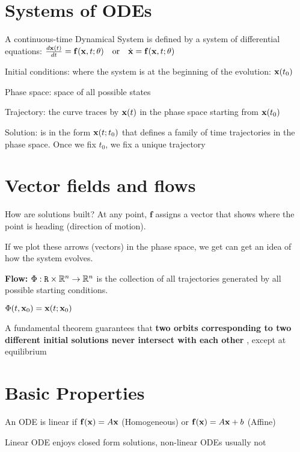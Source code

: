 \section*{Systems of ODEs}

A continuous-time Dynamical System is defined by a system of differential equations:
$
\frac{d\mathbf{x}(t)}{dt} = \mathbf{f}(\mathbf{x}, t; \theta) \quad \text{or} \quad \dot{\mathbf{x}} = \mathbf{f}(\mathbf{x}, t; \theta)
$

\begin{tightitemize}
    \item Initial conditions: where the system is at the beginning of the evolution:
    $\mathbf{x}(t_0)$
    \item Phase space: space of all possible states
    \item Trajectory: the curve traces by $\mathbf{x}(t)$ in the phase space starting from $\mathbf{x}(t_0)$
    \item Solution: is in the form $\mathbf{x}(t; t_0)$ that defines a family of time trajectories
    in the phase space. Once we fix $t_0$, we fix a unique trajectory
\end{tightitemize}

\section*{Vector fields and flows}
How are solutions built? At any point, $\mathbf{f}$ assigns a vector
that shows where the point is heading (direction of motion).

If we plot these arrows (vectors) in the phase space, we get can
get an idea of how the system evolves.

\textbf{Flow: } $\Phi: \mathtt{R} \times \mathbb{R}^n \to \mathbb{R}^n$ is the collection of
all trajectories generated by all possible starting conditions.

$\Phi(t, \mathbf{x}_0) = \mathbf{x}(t; \mathbf{x}_0)$


A fundamental theorem guarantees
that \textbf{two orbits corresponding to two different initial solutions never intersect with
each other }, except at equilibrium

\section*{Basic Properties}

An ODE is linear if $\mathbf{f}(\mathbf{x}) = A\mathbf{x}$ (Homogeneous) or 
$\mathbf{f}(\mathbf{x}) = A\mathbf{x} + b$ (Affine)

Linear ODE enjoys closed form solutions, non-linear ODEs usually not


